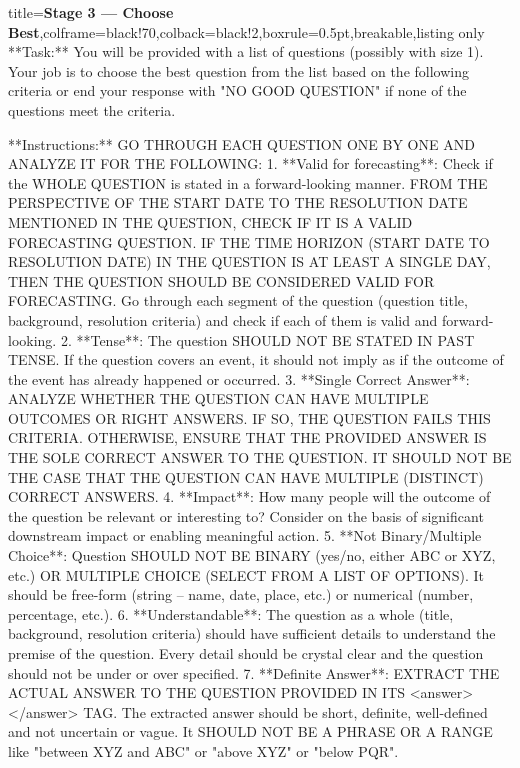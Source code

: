 \documentclass{article} %
\begin{document}
\begin{tcblisting}{title={\textbf{Stage 3 --- Choose Best}},colframe=black!70,colback=black!2,boxrule=0.5pt,breakable,listing only}
**Task:** You will be provided with a list of questions (possibly with size 1). Your job is to choose the best question from the list based on the following criteria or end your response with "NO GOOD QUESTION" if none of the questions meet the criteria.

**Instructions:**
GO THROUGH EACH QUESTION ONE BY ONE AND ANALYZE IT FOR THE FOLLOWING:
1. **Valid for forecasting**: Check if the WHOLE QUESTION is stated in a forward-looking manner. FROM THE PERSPECTIVE OF THE START DATE TO THE RESOLUTION DATE MENTIONED IN THE QUESTION, CHECK IF IT IS A VALID FORECASTING QUESTION. IF THE TIME HORIZON (START DATE TO RESOLUTION DATE) IN THE QUESTION IS AT LEAST A SINGLE DAY, THEN THE QUESTION SHOULD BE CONSIDERED VALID FOR FORECASTING. Go through each segment of the question (question title, background, resolution criteria) and check if each of them is valid and forward-looking.
2. **Tense**: The question SHOULD NOT BE STATED IN PAST TENSE. If the question covers an event, it should not imply as if the outcome of the event has already happened or occurred.
3. **Single Correct Answer**: ANALYZE WHETHER THE QUESTION CAN HAVE MULTIPLE OUTCOMES OR RIGHT ANSWERS. IF SO, THE QUESTION FAILS THIS CRITERIA. OTHERWISE, ENSURE THAT THE PROVIDED ANSWER IS THE SOLE CORRECT ANSWER TO THE QUESTION. IT SHOULD NOT BE THE CASE THAT THE QUESTION CAN HAVE MULTIPLE (DISTINCT) CORRECT ANSWERS.
4. **Impact**: How many people will the outcome of the question be relevant or interesting to? Consider on the basis of significant downstream impact or enabling meaningful action.
5. **Not Binary/Multiple Choice**: Question SHOULD NOT BE BINARY (yes/no, either ABC or XYZ, etc.) OR MULTIPLE CHOICE (SELECT FROM A LIST OF OPTIONS). It should be free-form (string -- name, date, place, etc.) or numerical (number, percentage, etc.). 
6. **Understandable**: The question as a whole (title, background, resolution criteria) should have sufficient details to understand the premise of the question. Every detail should be crystal clear and the question should not be under or over specified. 
7. **Definite Answer**: EXTRACT THE ACTUAL ANSWER TO THE QUESTION PROVIDED IN ITS <answer> </answer> TAG. The extracted answer should be short, definite, well-defined and not uncertain or vague. It SHOULD NOT BE A PHRASE OR A RANGE like "between XYZ and ABC" or "above XYZ" or "below PQR". 




\end{tcblisting}
\end{document}

